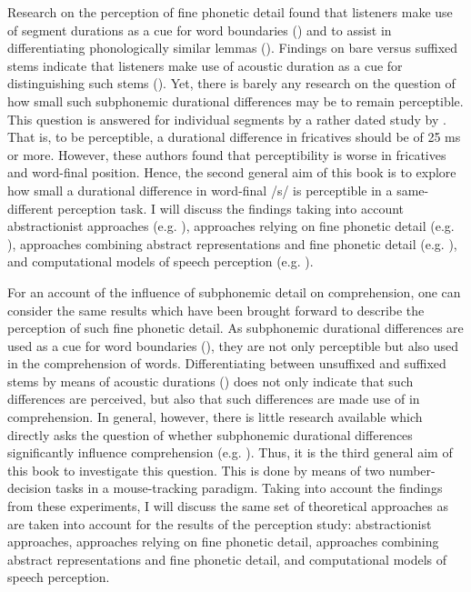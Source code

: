 Research on the perception of fine phonetic detail found that listeners make use of segment durations as a cue for word boundaries (\cite{Shatzman2006}) and to assist in differentiating phonologically similar lemmas (\cite{Warner2004}). Findings on bare versus suffixed stems indicate that listeners make use of acoustic duration as a cue for distinguishing such stems (\cite{Kemps2005a, Kemps2005b, Blazej2015}). Yet, there is barely any research on the question of how small such subphonemic durational differences may be to remain perceptible. This question is answered for individual segments by a rather dated study by \citet{Klatt1975}. That is, to be perceptible, a durational difference in fricatives should be of 25 ms or more. However, these authors found that perceptibility is worse in fricatives and word-final position. Hence, the second general aim of this book is to explore how small a durational difference in word-final /s/ is perceptible in a same-different perception task. I will discuss the findings taking into account abstractionist approaches (e.g. \cite{Klatt1979, McClelland1986, Norris1994, Norris2008}), approaches relying on fine phonetic detail (e.g. \cite{Goldinger1996}), approaches combining abstract representations and fine phonetic detail (e.g. \cite{Hawkins2001, Pierrehumbert2002}), and computational models of speech perception (e.g. \cite{tenBosch2015, Baayen2019}).

\largerpage
For an account of the influence of subphonemic detail on comprehension, one can consider the same results which have been brought forward to describe the perception of such fine phonetic detail. As subphonemic durational differences are used as a cue for word boundaries (\cite{Shatzman2006}), they are not only perceptible but also used in the comprehension of words. Differentiating between unsuffixed and suffixed stems by means of acoustic durations (\cite{Kemps2005a, Kemps2005b, Blazej2015}) does not only indicate that such differences are perceived, but also that such differences are made use of in comprehension. In general, however, there is little research available which directly asks the question of whether subphonemic durational differences significantly influence comprehension (e.g. \cite{Blazej2015}). Thus, it is the third general aim of this book to investigate this question. This is done by means of two number-decision tasks in a mouse-tracking paradigm. Taking into account the findings from these experiments, I will discuss the same set of theoretical approaches as are taken into account for the results of the perception study: abstractionist approaches, approaches relying on fine phonetic detail, approaches combining abstract representations and fine phonetic detail, and computational models of speech perception. 

